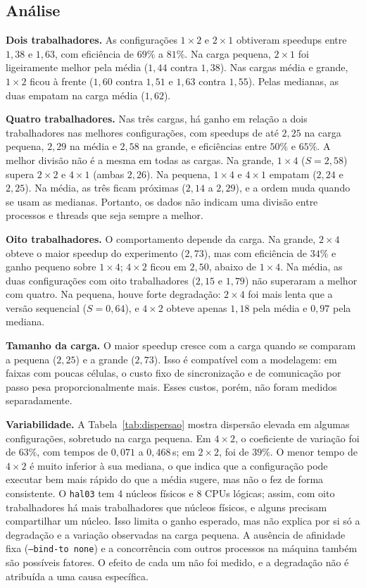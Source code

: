 \documentclass[11pt,a4paper]{article}
\begin{document}
\subsection{Análise}

\textbf{Dois trabalhadores.} As configurações $1\times2$ e $2\times1$
obtiveram speedups entre $1{,}38$ e $1{,}63$, com eficiência de $69\%$ a
$81\%$. Na carga pequena, $2\times1$ foi ligeiramente melhor pela média
($1{,}44$ contra $1{,}38$). Nas cargas média e grande, $1\times2$ ficou à
frente ($1{,}60$ contra $1{,}51$ e $1{,}63$ contra $1{,}55$). Pelas medianas,
as duas empatam na carga média ($1{,}62$).

\textbf{Quatro trabalhadores.} Nas três cargas, há ganho em relação a dois
trabalhadores nas melhores configurações, com speedups de até $2{,}25$ na
carga pequena, $2{,}29$ na média e $2{,}58$ na grande, e eficiências entre
$50\%$ e $65\%$. A melhor divisão não é a mesma em todas as cargas. Na
grande, $1\times4$ ($S=2{,}58$) supera $2\times2$ e $4\times1$ (ambas
$2{,}26$). Na pequena, $1\times4$ e $4\times1$ empatam ($2{,}24$ e
$2{,}25$). Na média, as três ficam próximas ($2{,}14$ a $2{,}29$), e a
ordem muda quando se usam as medianas. Portanto, os dados não indicam uma
divisão entre processos e threads que seja sempre a melhor.

\textbf{Oito trabalhadores.} O comportamento depende da carga. Na grande,
$2\times4$ obteve o maior speedup do experimento ($2{,}73$), mas com
eficiência de $34\%$ e ganho pequeno sobre $1\times4$; $4\times2$ ficou em
$2{,}50$, abaixo de $1\times4$. Na média, as duas configurações com oito
trabalhadores ($2{,}15$ e $1{,}79$) não superaram a melhor com quatro. Na
pequena, houve forte degradação: $2\times4$ foi mais lenta que a versão
sequencial ($S=0{,}64$), e $4\times2$ obteve apenas $1{,}18$ pela média e
$0{,}97$ pela mediana.

\textbf{Tamanho da carga.} O maior speedup cresce com a carga quando se
comparam a pequena ($2{,}25$) e a grande ($2{,}73$). Isso é compatível com a
modelagem: em faixas com poucas células, o custo fixo de sincronização e de
comunicação por passo pesa proporcionalmente mais. Esses custos, porém, não
foram medidos separadamente.

\textbf{Variabilidade.} A Tabela~\ref{tab:dispersao} mostra dispersão
elevada em algumas configurações, sobretudo na carga pequena. Em
$4\times2$, o coeficiente de variação foi de $63\%$, com tempos de $0{,}071$
a $0{,}468$\,s; em $2\times2$, foi de $39\%$. O menor tempo de $4\times2$
é muito inferior à sua mediana, o que indica que a configuração pode executar
bem mais rápido do que a média sugere, mas não o fez de forma consistente.
O \texttt{hal03} tem 4
núcleos físicos e 8 CPUs lógicas; assim, com oito trabalhadores há mais
trabalhadores que núcleos físicos, e alguns precisam compartilhar um núcleo.
Isso limita o ganho esperado, mas não explica por si só a degradação e a
variação observadas na carga pequena. A ausência de afinidade fixa
(\texttt{--bind-to none}) e a concorrência com outros processos na máquina
também são possíveis fatores. O efeito de cada um não foi medido, e a
degradação não é atribuída a uma causa específica.
\end{document}

